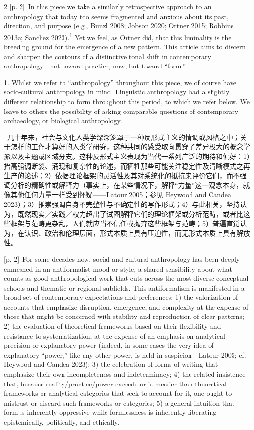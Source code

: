 \documentclass[10pt,a4paper]{article}
\begin{document}
\begin{paracol}{2}
{\scriptsize\color{gray} [p. 2]}\ In this piece we take a similarly retrospective approach to an anthropology that today too seems fragmented and anxious about its past, direction, and purpose (e.g., Bunzl 2008; Jobson 2020; Ortner 2015; Robbins 2013a; Sanchez 2023).\textsuperscript{1} Yet we feel, as Ortner did, that this liminality is the breeding ground for the emergence of a new pattern. This article aims to discern and sharpen the contours of a distinctive tonal shift in contemporary anthropology—not toward practice, now, but toward “form.”\par{\small 1. Whilst we refer to “anthropology” throughout this piece, we of course have socio-cultural anthropology in mind. Linguistic anthropology had a slightly different relationship to form throughout this period, to which we refer below. We leave to others the possibility of asking comparable questions of contemporary archaeology, or biological anthropology.\par}
\switchcolumn*
{\scriptsize\color{gray} [p. 2]}\ 几十年来，社会与文化人类学深深笼罩于一种反形式主义的情调或风格之中；关于怎样的工作才算好的人类学研究，这种共同的感受取向贯穿了差异极大的概念学派以及主题或区域分支。这种反形式主义表现为当代一系列广泛的期待和偏好：1）抬高强调断裂、涌现和复杂性的论述，而牺牲那些可能关注稳定性及清晰模式之再生产的论述；2）依据理论框架的灵活性及其对系统化的抵抗来评价它们，而不强调分析的精确性或解释力（事实上，在某些情况下，解释“力量”这一观念本身，就像其他任何力量一样受到怀疑——Latour 2005；参见 Heywood and Candea 2023）；3）推崇强调自身不完整性与不确定性的写作形式；4）与此相关，坚持认为，既然现实／实践／权力超出了试图解释它们的理论框架或分析范畴，或者比这些框架与范畴更杂乱，人们就应当不信任或抛弃这些框架与范畴；5）普遍直觉认为，在认识、政治和伦理层面，形式本质上具有压迫性，而无形式本质上具有解放性。\par
\switchcolumn
{\scriptsize\color{gray} [p. 2]}\ For some decades now, social and cultural anthropology has been deeply enmeshed in an antiformalist mood or style, a shared sensibility about what counts as good anthropological work that cuts across the most diverse conceptual schools and thematic or regional subfields. This antiformalism is manifested in a broad set of contemporary expectations and preferences: 1) the valorization of accounts that emphasize disruption, emergence, and complexity at the expense of those that might be concerned with stability and reproduction of clear patterns; 2) the evaluation of theoretical frameworks based on their flexibility and resistance to systematization, at the expense of an emphasis on analytical precision or explanatory power (indeed, in some cases the very idea of explanatory “power,” like any other power, is held in suspicion—Latour 2005; cf. Heywood and Candea 2023); 3) the celebration of forms of writing that emphasize their own incompleteness and indeterminacy; 4) the related insistence that, because reality/practice/power exceeds or is messier than theoretical frameworks or analytical categories that seek to account for it, one ought to mistrust or discard such frameworks or categories; 5) a general intuition that form is inherently oppressive while formlessness is inherently liberating—epistemically, politically, and ethically.\par

\end{paracol}
\end{document}
